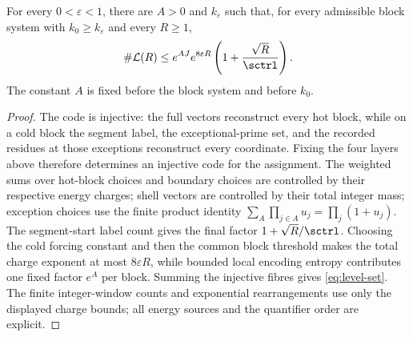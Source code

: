 \begin{proposition}\label{prop:level-set}
For every $0<\varepsilon<1$, there are $A>0$ and $k_\varepsilon$ such that,
for every admissible block system with $k_0\ge k_\varepsilon$ and every
$R\ge1$,
\begin{equation}\label{eq:level-set}
 \#\mathcal L(R)
 \le e^{AJ}e^{8\varepsilon R}
 \left(1+\frac{\sqrt R}{\sctrl}\right).
\end{equation}
The constant $A$ is fixed before the block system and before $k_0$.
\end{proposition}
\begin{proof}
The code is injective: the full vectors reconstruct every hot block, while on
a cold block the segment label, the exceptional-prime set, and the recorded
residues at those exceptions reconstruct every coordinate.  Fixing the four
layers above therefore determines an injective code for the assignment.  The weighted sums over hot-block choices and boundary
choices are controlled by their respective energy charges; shell vectors are
controlled by their total integer mass; exception choices use the finite
product identity
$\sum_A\prod_{j\in A}u_j=\prod_j(1+u_j)$.  The segment-start label count gives
the final factor $1+\sqrt R/\sctrl$.  Choosing the cold forcing constant and
then the common block threshold makes the total charge exponent at most
$8\varepsilon R$, while bounded local encoding entropy contributes one fixed
factor $e^A$ per block.  Summing the injective fibres gives
\eqref{eq:level-set}.  The finite integer-window counts and exponential
rearrangements use only the displayed charge bounds; all energy sources and the
quantifier order are explicit.
\end{proof}


